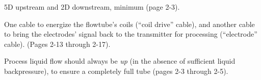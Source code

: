 
5D upstream and 2D downstream, minimum (page 2-3).

\vskip 10pt

One cable to energize the flowtube's coils (``coil drive'' cable), and another cable to bring the electrodes' signal back to the transmitter for processing (``electrode'' cable).  (Pages 2-13 through 2-17).

\vskip 10pt

Process liquid flow should always be {\it up} (in the absence of sufficient liquid backpressure), to ensure a completely full tube (pages 2-3 through 2-5).




